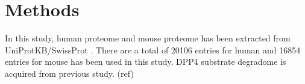 \section{Methods}
In this study, human proteome and mouse proteome has been extracted from UniProtKB/SwissProt \cite{2007}. There are a total of 20106 entries for human and 16854 entries for mouse has been used in this study. 
DPP4 substrate degradome is acquired from previous study. (ref) 

